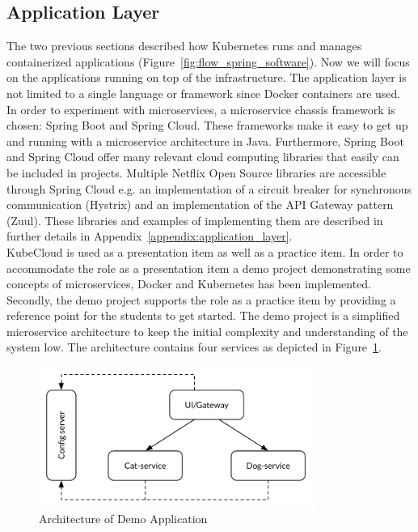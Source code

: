 
\subsection*{Application Layer}
The two previous sections described how Kubernetes runs and manages containerized applications (Figure~\ref{fig:flow_spring_software}). Now we will focus on the applications running on top of the infrastructure.
The application layer is not limited to a single language or framework since Docker containers are used. In order to experiment with microservices, a microservice chassis framework is chosen: Spring Boot and Spring Cloud. These frameworks make it easy to get up and running with a microservice architecture in Java. Furthermore, Spring Boot and Spring Cloud offer many relevant cloud computing libraries that easily can be included in projects. Multiple Netflix Open Source libraries are accessible through Spring Cloud e.g. an implementation of a circuit breaker for synchronous communication (Hystrix) and an implementation of the API Gateway pattern (Zuul). These libraries and examples of implementing them are described in further details in Appendix~\ref{appendix:application_layer}. \\


\noindent
KubeCloud is used as a presentation item as well as a practice item. In order to accommodate the role as a presentation item a demo project demonstrating some concepts of microservices, Docker and Kubernetes has been implemented. Secondly, the demo project supports the role as a practice item by providing a reference point for the students to get started. The demo project is a simplified microservice architecture to keep the initial complexity and understanding of the system low. The architecture contains four services as depicted in Figure~\ref{fig:demo}.

\begin{figure}[H]
    \centering
    \includegraphics[width=9cm]{figures/demo_architecture}
    \caption{Architecture of Demo Application}
    \label{fig:demo}
\end{figure}


